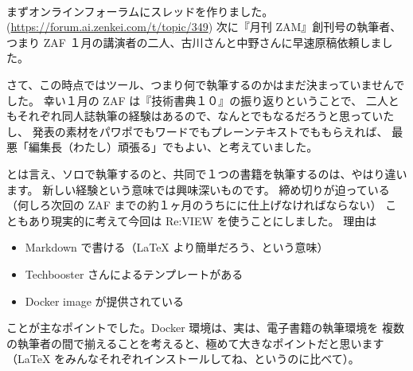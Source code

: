 \documentclass[dvipdfmx,autodetect-engine,10pt,b5paper,papersize,openany,dvipsnames]{jsbook}
\begin{document}
\begin{multicols}{2}
\vspace{7.2cm}


まずオンラインフォーラムにスレッドを作りました。
(\url{https://forum.ai.zenkei.com/t/topic/349})
次に『月刊 ZAM』創刊号の執筆者、つまり
ZAF １月の講演者の二人、古川さんと中野さんに早速原稿依頼しました。


\vspace{5.2cm}

さて、この時点ではツール、つまり何で執筆するのかはまだ決まっていませんでした。
幸い１月の ZAF は『技術書典１０』の振り返りということで、
二人ともそれぞれ同人誌執筆の経験はあるので、なんとでもなるだろうと思っていたし、
発表の素材をパワポでもワードでもプレーンテキストでももらえれば、
最悪「編集長（わたし）頑張る」でもよい、と考えていました。

とは言え、ソロで執筆するのと、共同で１つの書籍を執筆するのは、やはり違います。
新しい経験という意味では興味深いものです。
締め切りが迫っている（何しろ次回の ZAF までの約１ヶ月のうちにに仕上げなければならない）
こともあり現実的に考えて今回は Re:VIEW を使うことにしました。
理由は
\begin{itemize}
\item Markdown で書ける（\LaTeX{} より簡単だろう、という意味）
\item Techbooster さんによるテンプレートがある
\item Docker image が提供されている
\end{itemize}
ことが主なポイントでした。Docker 環境は、実は、電子書籍の執筆環境を
複数の執筆者の間で揃えることを考えると、極めて大きなポイントだと思います
（\LaTeX{} をみんなそれぞれインストールしてね、というのに比べて）。



\end{multicols}
\end{document}
